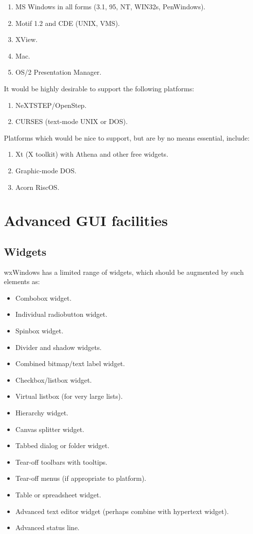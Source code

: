\begin{enumerate}
\item MS Windows in all forms (3.1, 95, NT, WIN32s, PenWindows).
\item Motif 1.2 and CDE (UNIX, VMS).
\item XView.
\item Mac.
\item OS/2 Presentation Manager.
\end{enumerate}

It would be highly desirable to support the following platforms:

\begin{enumerate}
\item NeXTSTEP/OpenStep.
\item CURSES (text-mode UNIX or DOS).
\end{enumerate}

Platforms which would be nice to support, but are by no means essential, include:

\begin{enumerate}
\item Xt (X toolkit) with Athena and other free widgets.
\item Graphic-mode DOS.
\item Acorn RiscOS.
\end{enumerate}

\chapter{Advanced GUI facilities}

\section{Widgets}

wxWindows has a limited range of widgets, which should be augmented by
such elements as:

\begin{itemize}
\item Combobox widget.
\item Individual radiobutton widget.
\item Spinbox widget.
\item Divider and shadow widgets.
\item Combined bitmap/text label widget.
\item Checkbox/listbox widget.
\item Virtual listbox (for very large lists).
\item Hierarchy widget.
\item Canvas splitter widget.
\item Tabbed dialog or folder widget.
\item Tear-off toolbars with tooltips.
\item Tear-off menus (if appropriate to platform).
\item Table or spreadsheet widget.
\item Advanced text editor widget (perhaps combine with hypertext
widget).
\item Advanced status line.
\end{itemize}

